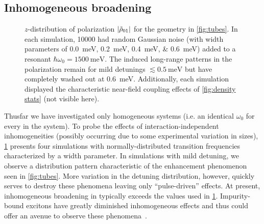 \subsection{Inhomogeneous broadening}

\begin{figure}
  \centering
  
  \caption{\label{fig:broadened} 
    $z$-distribution of polarization $\abs{\tilde{\rho}_{01}}$ for the geometry in \cref{fig:tubes}.
    In each simulation, \num{10000} \qds{} had random Gaussian noise (with width parameters of \SIlist{0.0;0.2;0.4;0.6}{\milli\eV}) added to a resonant $\hbar \omega_0 = \SI{1500}{\milli\eV}$.
    The induced long-range patterns in the polarization remain for mild detunings $\lesssim \SI{0.5}{\milli\eV}$ but have completely washed out at \SI{0.6}{\milli\eV}.
    Additionally, each simulation displayed the characteristic near-field coupling effects of \cref{fig:density stats} (not visible here).
  }
\end{figure}

Thusfar we have investigated only homogeneous systems (i.e. an identical $\omega_0$ for every \qd{} in the system).
To probe the effects of interaction-independent inhomogeneities (possibly occurring due to some experimental variation in \qd{} sizes), \cref{fig:broadened} presents four simulations with normally-distributed transition frequencies characterized by a width parameter.
In simulations with mild detuning, we observe a distribution pattern characteristic of the enhancement phenomenon seen in \cref{fig:tubes}.
More variation in the detuning distribution, however, quickly serves to destroy these phenomena leaving only ``pulse-driven'' effects.
At present, inhomogeneous broadening in \qds{} typically exceeds the values used in \cref{fig:broadened}.
Impurity-bound excitons have greatly diminished inhomogeneous effects and thus could offer an avenue to observe these phenomena~\cite{Thewalt1977}.
